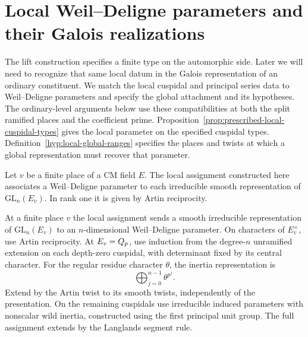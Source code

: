 \section{Local Weil--Deligne parameters and their Galois realizations}
\label{sec:local-global}

The lift construction specifies a finite type on the automorphic side. Later we will
need to recognize that same local datum in the Galois representation of an ordinary
constituent. We match the local cuspidal
and principal series data to Weil--Deligne parameters and
specify the global attachment and its hypotheses. The
ordinary-level arguments below use these compatibilities
at both the split ramified places and the coefficient prime. Proposition~\ref{prop:prescribed-local-cuspidal-types} gives the local parameter on the specified cuspidal types. Definition~\ref{hyp:local-global-ranges} specifies the places and twists at which a global representation must recover that parameter.

Let \(v\) be a finite place of a CM field \(E\).
The local assignment constructed here associates a Weil--Deligne parameter to each irreducible smooth representation of \(\mathrm{GL}_n(E_v)\). In rank one it is given by Artin reciprocity.
\begin{proposition}\label{prop:prescribed-local-cuspidal-types}
At a finite place \(v\) the local assignment sends a smooth irreducible representation of \(\mathrm{GL}_n(E_v)\) to an \(n\)-dimensional Weil--Deligne parameter. On characters of \(E_v^\times\), use Artin reciprocity.
At \(E_v=Q_p\), use induction from the degree-\(n\) unramified extension on each depth-zero cuspidal, with determinant fixed by its central character. For the regular residue character \(\theta\), the inertia representation is 
\[
 \bigoplus_{j=0}^{n-1}\theta^{p^j}.
\]
 Extend by the Artin twist to its smooth
twists, independently of the presentation. On the remaining
cuspidals use irreducible induced parameters with nonscalar
wild inertia, constructed using the first principal unit group. The full assignment extends by
the Langlands segment rule.
\end{proposition}

